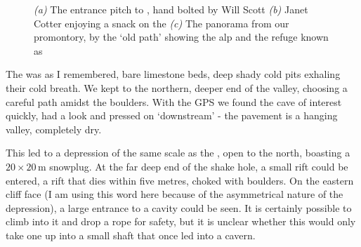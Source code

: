 \begin{figure}[t!]
\checkoddpage \ifoddpage \forcerectofloat \else \forceversofloat \fi
    \centering
    \begin{subfigure}[t]{0.59\textwidth}
        \centering
        \caption{} \label{Will Scott bolting}
    \end{subfigure}
    \hfill
    \begin{subfigure}[t]{0.393\textwidth}
        \centering
        \caption{} \label{Ice}
    \end{subfigure}

    \vspace{0.3cm}
    \begin{subfigure}[t]{\textwidth}
    \centering
        \caption{} \label{Panorama}
    \end{subfigure}
    \caption{
    \emph{(a)} The entrance pitch to \protect{}, hand bolted by Will Scott
    \emph{(b)} Janet Cotter enjoying a snack on the \protect{}
    \emph{(c)} The panorama from our promontory, by the `old \protect{} path' showing the \protect{} alp and the refuge known as \protect{} }
\end{figure}


The  was as I remembered, bare limestone beds, deep shady cold pits exhaling their cold breath. We kept to the northern, deeper end of the valley, choosing a careful path amidst the boulders. With the GPS we found the cave of interest quickly, had a look and pressed on `downstream' - the pavement is a hanging valley, completely dry. 

This led to  a depression of the same scale as the , open to the north, boasting a $20\times20$\,m snowplug. At the far deep end of the shake hole, a small rift could be entered, a rift that dies within five metres, choked with boulders. On the eastern cliff face  (I am using this word here because of the asymmetrical nature of the depression), a large entrance to a cavity could be seen. It is certainly possible to climb into it and drop a rope for safety, but it is unclear whether this would only take one up into a small shaft that once led into a cavern. 

